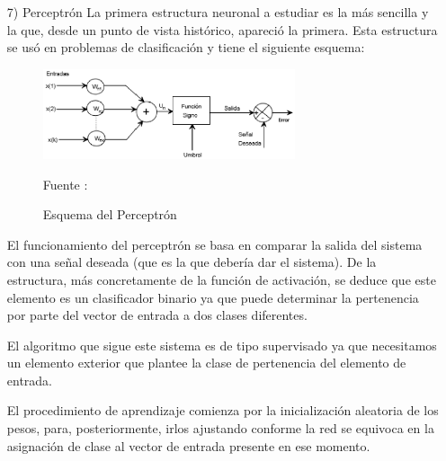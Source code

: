 \documentclass[a4paper, 12pt]{article}
\begin{document}
\begin{enumerate}
\item[7)] Perceptrón
\vskip 0.3cm
\citep{serrano} La primera estructura neuronal a estudiar es la más sencilla y la que, desde un punto de vista histórico, apareció la primera. Esta estructura se usó en problemas de clasificación y tiene el siguiente esquema:\par
\begin{figure}[ht]
\begin{center}
\includegraphics[width=0.7\textwidth]{perceptron}
\end{center}
\begin{center}
\caption{\small{Esquema del Perceptrón}}
{\small{Fuente : \cite{serrano}}}
\end{center}
\end{figure}
El funcionamiento del perceptrón se basa en comparar la salida del sistema con una señal deseada (que es la que debería dar el sistema). De la estructura, más concretamente de la función de activación, se deduce que este elemento es un clasificador binario ya que puede determinar la pertenencia por parte del vector de entrada a dos clases diferentes.\par
El algoritmo que sigue este sistema es de tipo supervisado ya que necesitamos un elemento exterior que plantee la clase de pertenencia del elemento de entrada.\par
El procedimiento de aprendizaje comienza por la inicialización aleatoria de los pesos, para, posteriormente, irlos ajustando conforme la red se equivoca en la asignación de clase al vector de entrada presente en ese momento.\par

\vskip 0.3cm



\end{enumerate}
\end{document}
